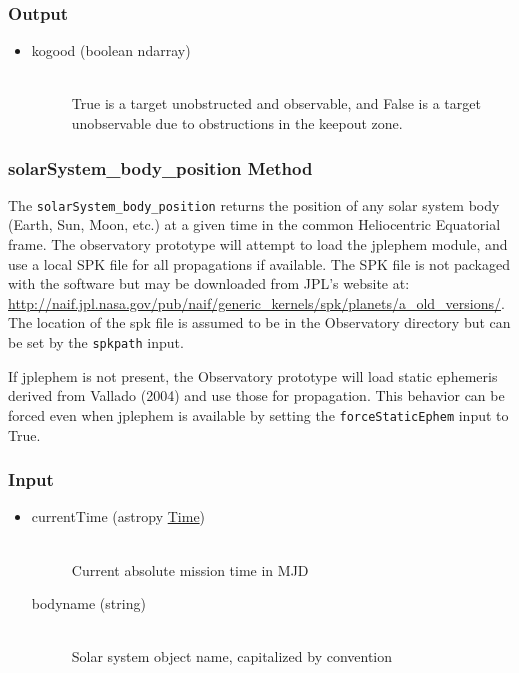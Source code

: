 \documentclass[cleanfoot]{asme2ej}
\begin{document}
\subsubsection*{Output}
\begin{itemize}
\item 
\begin{description}
    \item[kogood (boolean ndarray)] \hfill \\ True is a target unobstructed and observable, and False is a target unobservable due to obstructions in the keepout zone.
\end{description}
\end{itemize}

\subsubsection{solarSystem\_body\_position Method}\label{sec:ssbPosTask}
The \verb+solarSystem_body_position+ returns the position of any solar system body (Earth, Sun, Moon, etc.) at a given time in the common Heliocentric Equatorial frame.  The observatory prototype will attempt to load the jplephem module, and use a local SPK file for all propagations if available.  The SPK file is not packaged with the software but may be downloaded from JPL's website at: \url{http://naif.jpl.nasa.gov/pub/naif/generic_kernels/spk/planets/a_old_versions/}.  The location of the spk file is assumed to be in the Observatory directory but can be set by the \verb+spkpath+ input.  

If jplephem is not present, the Observatory prototype will load static ephemeris derived from Vallado (2004) and use those for propagation.  This behavior can be forced even when jplephem is available by setting the \verb+forceStaticEphem+ input to True.

\subsubsection*{Input}
\begin{itemize}
\item
\begin{description}
    \item[currentTime (astropy \href{http://astropy.readthedocs.org/en/latest/time/index.html}{Time})] \hfill \\ Current absolute mission time in MJD
    \item[bodyname (string)] \hfill \\ Solar system object name, capitalized by convention
\end{description}
\end{itemize}
\end{document}
